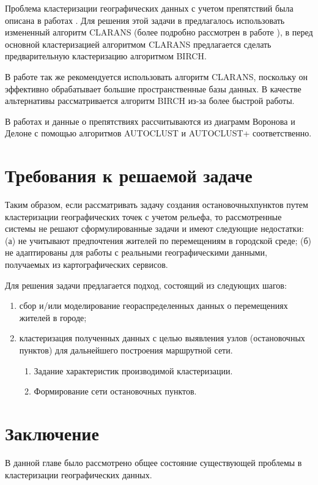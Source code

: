 Проблема кластеризации географических данных с учетом препятствий была описана в работах \cite{presence, cod}. Для решения этой задачи в \cite{presence} предлагалось использовать измененный алгоритм CLARANS (более подробно рассмотрен в работе \cite{cod}), в \cite{cod} перед основной кластеризацией алгоритмом CLARANS предлагается сделать предварительную кластеризацию алгоритмом BIRCH.

В работе \cite{koperski} так же рекомендуется использовать алгоритм CLARANS, поскольку он эффективно обрабатывает большие пространственные базы данных. В качестве альтернативы рассматривается алгоритм BIRCH из-за более быстрой работы.

В работах \cite{estivill} и \cite{obstacles} данные о препятствиях рассчитываются из диаграмм Воронова и Делоне с помощью алгоритмов AUTOCLUST и AUTO\-CLUST+ соответственно.

\section{Требования к решаемой задаче}
Таким образом, если рассматривать задачу создания остановочных\linebreak пунктов путем кластеризации географических точек с учетом рельефа, то рассмотренные системы не решают сформулированные задачи и имеют следующие недостатки: (а) не учитывают предпочтения жителей по перемещениям в городской среде; (б) не адаптированы для работы с реальными географическими данными, получаемых из картографических сервисов.

Для решения задачи предлагается подход, состоящий из следующих шагов:
\begin{enumerate}
    \item сбор и/или моделирование геораспределенных данных о перемещениях жителей в городе;
    \item кластеризация полученных данных с целью выявления узлов (остановочных пунктов) для дальнейшего построения маршрутной сети.
    \begin{enumerate}
        \item Задание характеристик производимой кластеризации.
        \item Формирование сети остановочных пунктов.
    \end{enumerate}
\end{enumerate}

\section{Заключение}
В данной главе было рассмотрено общее состояние существующей проблемы в кластеризации географических данных. 
